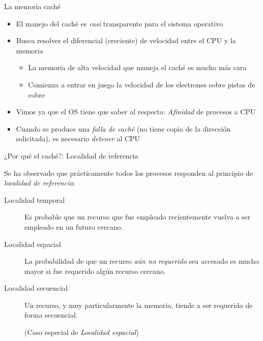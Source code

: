 \documentclass[presentation]{beamer}
\newcommand{\rarrow}{$\rightarrow$\hskip 0.5em}
\begin{document}
\begin{frame}[label={sec:orgd446ebc},fragile]{La memoria caché}
 \begin{itemize}
\item El manejo del caché es \emph{casi} transparente para el sistema operativo
\item Busca resolver el diferencial (creciente) de velocidad entre el CPU
y la memoria
\begin{itemize}
\item La memoria de alta velocidad que maneja el caché es mucho más cara
\item Comienza a entrar en juego la velocidad de los electrones sobre
pistas de cobre
\end{itemize}
\item Vimos ya que el OS tiene que saber al respecto: \emph{Afinidad} de
procesos a CPU
\item Cuando se produce una \emph{falla de caché} (no tiene copia de la
dirección solicitada), es necesario \emph{detener} al CPU
\end{itemize}
\end{frame}

\begin{frame}[label={sec:orgf9ecc90}]{¿Por qué el caché?: Localidad de referencia}
\begin{center}
Se ha observado que prácticamente todos los procesos responden al
principio de \emph{localidad de referencia}:
\end{center}
\begin{description}
\item[{Localidad temporal}] Es probable que un recurso que fue empleado
recientemente vuelva a ser empleado en un futuro cercano.
\item[{Localidad espacial}] La probabilidad de que un recurso \emph{aún no
requerido} sea accesado es mucho mayor si fue requerido algún
recurso cercano.
\item[{Localidad secuencial}] Un recurso, y muy particularmente la
memoria, tiende a ser requerido de forma secuencial.

(Caso especial de \emph{Localidad espacial})
\end{description}
\end{frame}
\end{document}
